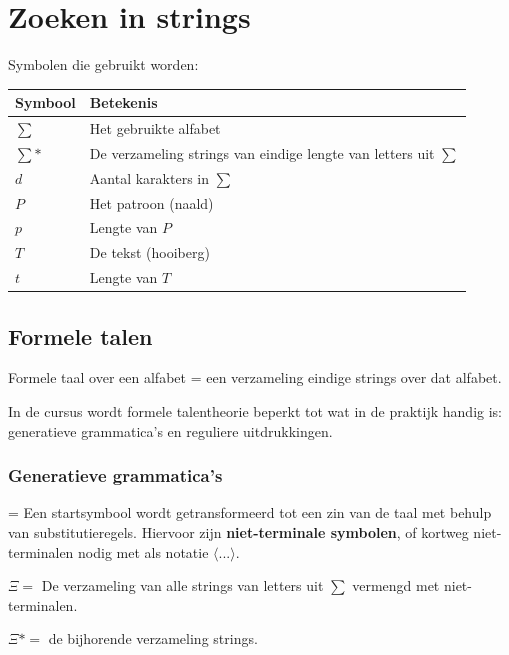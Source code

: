 \documentclass{report}
\begin{document}
\chapter{Zoeken in strings}
Symbolen die gebruikt worden:
\begin{table}[h]
	\centering
	\begin{tabular}{l l}
		\hline
		Symbool & Betekenis \\
		\hline 
		$\sum$ & Het gebruikte alfabet \\
		$\sum *$ & De verzameling strings van eindige lengte van letters uit $\sum$ \\
		$d$ & Aantal karakters in $\sum$ \\
		$P$ & Het patroon (naald) \\
		$p$ & Lengte van $P$ \\
		$T$ & De tekst (hooiberg) \\
		$t$ & Lengte van $T$ \\
		\hline 
	\end{tabular}
\end{table}
\section{Formele talen}
Formele taal over een alfabet = een verzameling eindige strings over dat alfabet. 

In de cursus wordt formele talentheorie beperkt tot wat in de praktijk handig is: generatieve grammatica's en reguliere uitdrukkingen.
\subsection{Generatieve grammatica's}
= Een startsymbool wordt getransformeerd tot een zin van de taal met behulp van substitutieregels. Hiervoor zijn \textbf{niet-terminale symbolen}, of kortweg niet-terminalen nodig met als notatie $\langle ... \rangle$.

$\Xi = $ De verzameling van alle strings van letters uit $\sum$ vermengd met niet-terminalen.

$\Xi* = $ de bijhorende verzameling strings.
\end{document}
